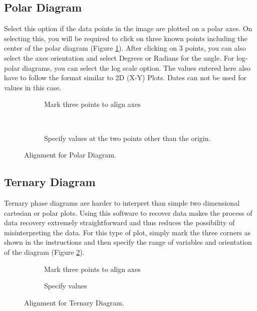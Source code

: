 \documentclass[letterpaper, 11pt]{article}
\begin{document}
\subsection{Polar Diagram}
Select this option if the data points in the image are plotted on a polar axes. On selecting this, you will be required to click on three known points including the center of the polar diagram (Figure \ref{fig:polarAlignment}). After clicking on 3 points, you can also select the axes orientation and select Degrees or Radians for the angle. For log-polar diagrams, you can select the log scale option. The values entered here also have to follow the format similar to 2D (X-Y) Plots. Dates can not be used for values in this case.

\begin{figure}[h]
\centering
{\begin{subfigure}[b]{0.5\textwidth}
\caption{Mark three points to align axes}
\end{subfigure}
\\
\vspace{5mm}
\begin{subfigure}[b]{0.5\textwidth}
\caption{Specify values at the two points other than the origin.}
\end{subfigure}}
\caption{Alignment for Polar Diagram.}
\label{fig:polarAlignment}
\end{figure}
 
\subsection{Ternary Diagram}
Ternary phase diagrams are harder to interpret than simple two dimensional cartesian or polar plots. Using this software to recover data makes the process of data recovery extremely straightforward and thus reduces the possibility of misinterpreting the data. For this type of plot, simply mark the three corners as shown in the instructions and then specify the range of variables and orientation of the diagram (Figure \ref{fig:ternaryAlignment}).

\begin{figure}[h]
\centering
{\begin{subfigure}[b]{0.4\textwidth}
\caption{Mark three points to align axes}
\end{subfigure}
\hspace{5mm}
\begin{subfigure}[b]{0.45\textwidth}
\caption{Specify values}
\end{subfigure}}
\caption{Alignment for Ternary Diagram.}
\label{fig:ternaryAlignment}
\end{figure}
\end{document}
